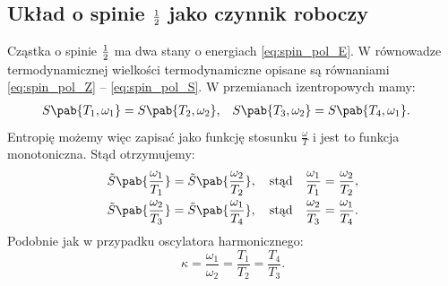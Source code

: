 
\subsection{Układ o spinie \(\frac{1}{2}\) jako czynnik roboczy}
Cząstka o spinie \(\frac{1}{2}\) ma dwa stany o energiach \eqref{eq:spin_pol_E}. W równowadze termodynamicznej wielkości termodynamiczne opisane są równaniami \eqref{eq:spin_pol_Z} -- \eqref{eq:spin_pol_S}. W przemianach izentropowych mamy:
\begin{align}
	S\pab{T_1,\omega_1} &= S\pab{T_2,\omega_2}, &
	S\pab{T_3,\omega_2} &= S\pab{T_4,\omega_1}.
\end{align}
Entropię możemy więc zapisać jako funkcję stosunku \(\frac{\omega}{T}\) i jest to funkcja monotoniczna. Stąd otrzymujemy:
\begin{equation}\label{eq:endo_otto_spin_pol_omegaT}
\begin{split}
\tilde{S}\pab{\frac{\omega_1}{T_1}} = \tilde{S}\pab{\frac{\omega_2}{T_2}}, \quad\text{stąd}\quad
\frac{\omega_1}{T_1} = \frac{\omega_2}{T_2}, \\
\tilde{S}\pab{\frac{\omega_2}{T_3}} = \tilde{S}\pab{\frac{\omega_1}{T_4}}, \quad\text{stąd}\quad
\frac{\omega_2}{T_3} = \frac{\omega_1}{T_4}.
\end{split}
\end{equation}
Podobnie jak w przypadku oscylatora harmonicznego:
\begin{equation}
	\kappa = \frac{\omega_1}{\omega_2} = \frac{T_1}{T_2} = \frac{T_4}{T_3}.
\end{equation}

